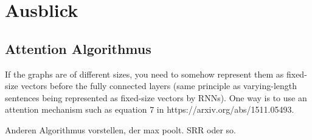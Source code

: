 \chapter{Ausblick}

\section{Attention Algorithmus}

If the graphs are of different sizes, you need to somehow represent them as fixed-size vectors before the fully connected layers (same principle as varying-length sentences being represented as fixed-size vectors by RNNs).
One way is to use an attention mechanism such as equation 7 in https://arxiv.org/abs/1511.05493.

Anderen Algorithmus vorstellen, der max poolt. SRR oder so.
